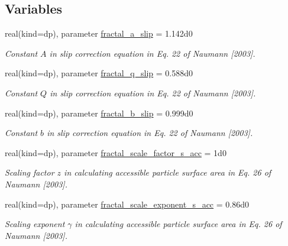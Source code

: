 \subsection*{Variables}
\begin{DoxyCompactItemize}
\item 
real(kind=dp), parameter \mbox{\hyperlink{namespacepmc__fractal_a0b42b06758d8152d9f0fa472d67a139f}{fractal\+\_\+a\+\_\+slip}} = 1.\+142d0
\begin{DoxyCompactList}\small\item\em Constant $A$ in slip correction equation in Eq. 22 of Naumann \mbox{[}2003\mbox{]}. \end{DoxyCompactList}\item 
real(kind=dp), parameter \mbox{\hyperlink{namespacepmc__fractal_a4eb07a31b109f029c727ec41f6497b42}{fractal\+\_\+q\+\_\+slip}} = 0.\+588d0
\begin{DoxyCompactList}\small\item\em Constant $Q$ in slip correction equation in Eq. 22 of Naumann \mbox{[}2003\mbox{]}. \end{DoxyCompactList}\item 
real(kind=dp), parameter \mbox{\hyperlink{namespacepmc__fractal_a45ff582e36f6e367d3339ee6a0026081}{fractal\+\_\+b\+\_\+slip}} = 0.\+999d0
\begin{DoxyCompactList}\small\item\em Constant $b$ in slip correction equation in Eq. 22 of Naumann \mbox{[}2003\mbox{]}. \end{DoxyCompactList}\item 
real(kind=dp), parameter \mbox{\hyperlink{namespacepmc__fractal_a163c8d35d3501518bf784a7a646c35c4}{fractal\+\_\+scale\+\_\+factor\+\_\+s\+\_\+acc}} = 1d0
\begin{DoxyCompactList}\small\item\em Scaling factor $z$ in calculating accessible particle surface area in Eq. 26 of Naumann \mbox{[}2003\mbox{]}. \end{DoxyCompactList}\item 
real(kind=dp), parameter \mbox{\hyperlink{namespacepmc__fractal_a37704d5061b9ee8a17187d37832a79c0}{fractal\+\_\+scale\+\_\+exponent\+\_\+s\+\_\+acc}} = 0.\+86d0
\begin{DoxyCompactList}\small\item\em Scaling exponent $\gamma$ in calculating accessible particle surface area in Eq. 26 of Naumann \mbox{[}2003\mbox{]}. \end{DoxyCompactList}\end{DoxyCompactItemize}


